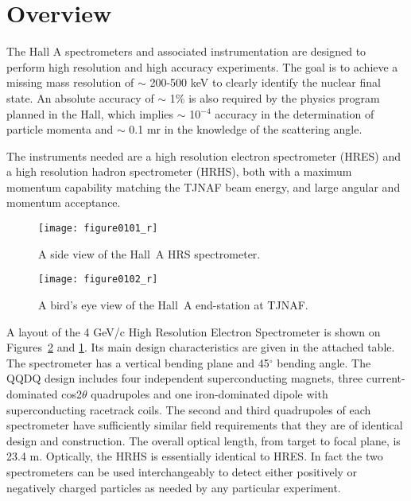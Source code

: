 \section{Overview}
   
The Hall A spectrometers and associated instrumentation are designed to 
perform high resolution and high accuracy experiments.  The goal is to 
achieve a missing mass resolution of $\sim$ 200-500 keV to clearly 
identify the nuclear final state.  An absolute accuracy of $\sim$ 1\% is 
also required by the physics program planned in the Hall, which implies 
$\sim$ 10$^{-4}$ accuracy in the determination of particle momenta and 
$\sim$ 0.1 mr in the knowledge of the scattering angle.

The instruments needed are a high resolution electron spectrometer 
(HRES) and a high resolution hadron spectrometer (HRHS), both with a 
maximum momentum capability matching the TJNAF beam energy, and large 
angular and momentum acceptance.

\begin{figure}[tbp]
\begin{center}
\texttt{[image: figure0101\_r]}
{\linespread{1.}
\caption[Spectrometers: Elevation View of Hall~A HRS]{A side view of the Hall~A
HRS spectrometer.}  
\label{fig:hrs_ev}}
\end{center}
\end{figure}
 
\begin{figure}[tbp]
\begin{center}
\texttt{[image: figure0102\_r]}
{\linespread{1.}
\caption[Spectrometers: Plan View of Hall~A]{A bird's eye view of the Hall~A
end-station at TJNAF.}  
\label{fig:hrs_pv}}
\end{center}
\end{figure}


A layout of the 4 GeV/c High Resolution Electron Spectrometer is shown 
on Figures~\ref{fig:hrs_pv} and \ref{fig:hrs_ev}.
Its main design characteristics are 
given in the attached table.  The spectrometer has a vertical bending 
plane and 45$^{\circ}$ bending angle.  The QQDQ design includes four 
independent superconducting magnets, three current-dominated 
cos2$\theta$ quadrupoles and one iron-dominated dipole with 
superconducting racetrack coils.  The second and third quadrupoles of 
each spectrometer have sufficiently similar field requirements that they 
are of identical design and construction.  The overall optical length, 
from target to focal plane, is 23.4 m.  Optically, the HRHS 
is essentially identical to HRES. In fact the two spectrometers can be used 
interchangeably to detect either positively or negatively charged particles 
as needed by any particular experiment. 


